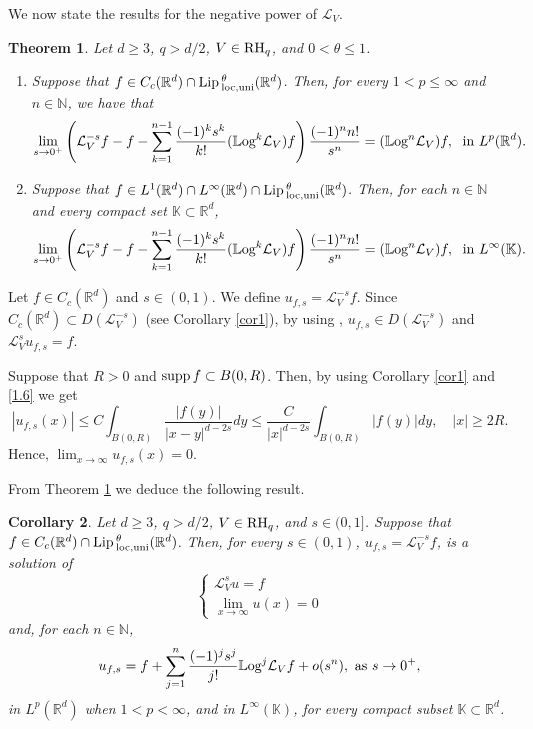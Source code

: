 \documentclass[10pt, a4paper, reqno]{amsart}
\newtheorem{thm}{Theorem}[section]
\newtheorem{cor}[thm]{Corollary}
\theoremstyle{definition}
\theoremstyle{remark}
\newcommand{\RH}{\textup{RH}}
\numberwithin{equation}{section}
\begin{document}
We now state the results for the negative power of $\mathcal L_V$.

\begin{thm}\label{Th1.3} Let $d\geq 3$, $q>d/2$, $V\in \RH_q$, and $0<\theta \leq 1$.
\begin{enumerate}[label=\textnormal{(\alph*)}]
    \item \label{itm: Th1.3-a} Suppose that $f\in C_c(\mathbb R^d)\cap {\textup{Lip}}\,^\theta _{\textup{loc},\textup{uni}}(\mathbb R^d)$. Then, for every $1<p\leq \infty$ and $n\in \mathbb N$, we have that
\[
\lim_{s\rightarrow 0^+}\left(\mathcal L_V^{-s}f-f-\sum_{k=1}^{n-1}\frac{(-1)^ks^k}{k!}(\mathbb{L}\textup{og}^k\mathcal L_V)f\right)\frac{(-1)^nn!}{s^n}=(\mathbb{L}\textup{og}^n\mathcal L_V)f,\; \mbox{ in }L^p(\mathbb R^d).
\]
\item \label{itm: Th1.3-b} Suppose that $f\in L^1(\mathbb R^d)\cap L^\infty (\mathbb R^d)\cap {\textup{Lip}}\,^\theta _{\textup{loc},\textup{uni}}(\mathbb R^d)$. Then, for each $n\in \mathbb N$ and every compact set $\mathbb K\subset \mathbb R^d$, 
\[
\lim_{s\rightarrow 0^+}\left(\mathcal L_V^{-s}f-f-\sum_{k=1}^{n-1}\frac{(-1)^ks^k}{k!}(\mathbb{L}\textup{og}^k\mathcal L_V)f\right)\frac{(-1)^nn!}{s^n}=(\mathbb{L}\textup{og}^n\mathcal L_V)f,\; \mbox{ in }L^\infty(\mathbb K).
\]
\end{enumerate}
\end{thm}

Let $f\in C_c(\mathbb R^d)$ and $s\in (0,1)$. We define $u_{f,s}=\mathcal L_V^{-s}f$. Since $C_c(\mathbb R^d)\subset D(\mathcal L_V^{-s})$ (see Corollary \ref{cor1}), by using \cite[Theorem 3(iv), p. 343]{Yo}, %
$u_{f,s}\in D(\mathcal L_V^{-s})$ and $\mathcal L_V^su_{f,s}=f$.

Suppose that $R>0$ and ${\rm supp}\,f\subset B(0,R)$. Then, by using Corollary \ref{cor1} and \eqref{1.6} we get 
\[
|u_{f,s}(x)|\leq C\int_{B(0,R)}\frac{|f(y)|}{|x-y|^{d-2s}}dy\leq \frac{C}{|x|^{d-2s}}\int_{B(0,R)}|f(y)|dy,\quad |x|\geq 2R.
\]
Hence, $\lim_{x\rightarrow \infty}u_{f,s}(x)=0$.

From Theorem \ref{Th1.3} we deduce the following result.
\begin{cor}
    Let $d\geq 3$, $q>d/2$, $V\in \RH_q$, and $s\in (0,1]$. Suppose that $f\in C_c(\mathbb R^d)\cap {\textup{Lip}}\,^\theta _{\textup{loc}, \textup{uni}}(\mathbb R^d)$. Then, for every $s\in (0,1)$, $u_{f,s}=\mathcal L
    _V^{-s}f$, is a solution of
    \[
    \left\{\begin{array}{r}
        \mathcal L_V^su=f\\
        \displaystyle \lim_{x\rightarrow \infty }u(x)=0 
    \end{array}
    \right.
    \]
    and, for each $n\in \mathbb N$,
    \[
    u_{f,s}=f+\sum_{j=1}^n\frac{(-1)^js^j}{j!}\mathbb{L}\textup{og}^j\mathcal{L}_Vf+o(s^n),\mbox{ as }s\rightarrow 0^+,
    \]
    in $L^p(\mathbb R^d)$ when $1<p<\infty$, and in $L^\infty(\mathbb K)$, for every compact subset $\mathbb K\subset \mathbb R^d$.
\end{cor}
\end{document}
